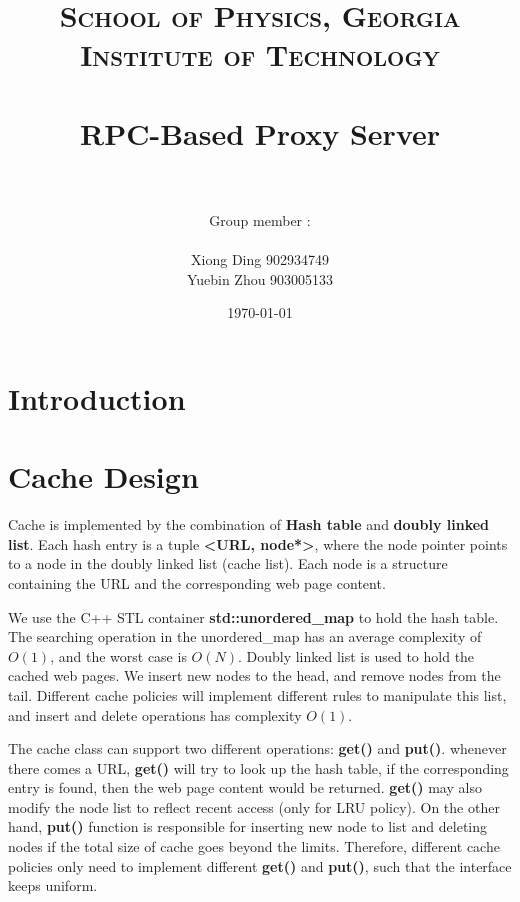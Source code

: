 \documentclass[paper=a4, fontsize=11pt]{scrartcl} %
\title{	
\normalfont \normalsize 
\textsc{School of Physics, Georgia Institute of Technology } \\ [25pt] %
\horrule{0.5pt} \\[0.4cm] %
\huge RPC-Based Proxy Server \\ %
\horrule{2pt} \\[0.5cm] %
}
\author{Group member : \\
\\
 Xiong Ding 902934749 \\ 
 Yuebin Zhou 903005133
} %
\date{\normalsize\today} %
\numberwithin{equation}{section} %
\numberwithin{figure}{section} %
\numberwithin{table}{section} %
\begin{document}
\maketitle %


\section{Introduction}

\section{Cache Design}

Cache is implemented by the combination of \textbf{Hash table} 
and \textbf{doubly linked list}. Each hash entry is 
a tuple \textbf{<URL, node*>}, where the node pointer points to a node
in the doubly linked list (cache list). Each node is a structure
containing the URL and the corresponding web page content.

\vspace{0.5em}

We use the C++ STL container \textbf{std::unordered\_map} to hold the 
hash table. The searching operation in the unordered\_map
has an average complexity of $O(1)$, and the worst case is $O(N)$. Doubly
linked list is used to hold the cached web pages. We insert new nodes
to the head, and remove nodes from the tail. Different cache policies will
implement different rules to manipulate this list, and insert and
delete operations has complexity $O(1)$.

\vspace{0.5em}

The cache class can support two different operations: \textbf{get()} and
\textbf{put()}. whenever there comes a URL, \textbf{get()} will try to look
up the hash table, if the corresponding entry is found, then the web page
content would be returned. 
\textbf{get()} may also modify the node list to reflect recent access
(only for LRU policy). On the other hand, \textbf{put()} function is
responsible for inserting new node to list and deleting nodes if the
total size of cache goes beyond the limits. Therefore, different cache 
policies only need to implement different \textbf{get()} and 
\textbf{put()}, 
such that the interface keeps uniform.
\end{document}
